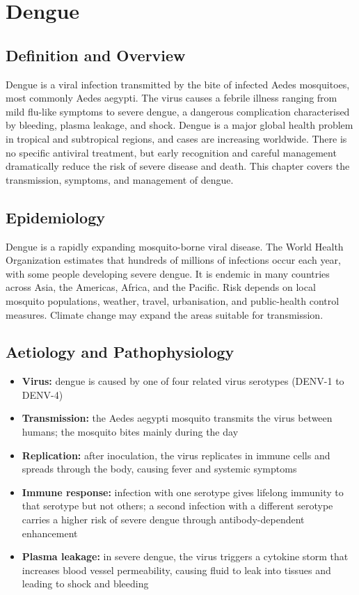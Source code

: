 \chapter{Dengue}

\section*{Definition and Overview}
Dengue is a viral infection transmitted by the bite of infected Aedes mosquitoes, most commonly Aedes aegypti. The virus causes a febrile illness ranging from mild flu-like symptoms to severe dengue, a dangerous complication characterised by bleeding, plasma leakage, and shock. Dengue is a major global health problem in tropical and subtropical regions, and cases are increasing worldwide. There is no specific antiviral treatment, but early recognition and careful management dramatically reduce the risk of severe disease and death. This chapter covers the transmission, symptoms, and management of dengue.

\section*{Epidemiology}
Dengue is a rapidly expanding mosquito-borne viral disease. The World Health Organization estimates that hundreds of millions of infections occur each year, with some people developing severe dengue. It is endemic in many countries across Asia, the Americas, Africa, and the Pacific. Risk depends on local mosquito populations, weather, travel, urbanisation, and public-health control measures. Climate change may expand the areas suitable for transmission.

\section*{Aetiology and Pathophysiology}
\begin{itemize}
    \item \textbf{Virus:} dengue is caused by one of four related virus serotypes (DENV-1 to DENV-4)
    \item \textbf{Transmission:} the Aedes aegypti mosquito transmits the virus between humans; the mosquito bites mainly during the day
    \item \textbf{Replication:} after inoculation, the virus replicates in immune cells and spreads through the body, causing fever and systemic symptoms
    \item \textbf{Immune response:} infection with one serotype gives lifelong immunity to that serotype but not others; a second infection with a different serotype carries a higher risk of severe dengue through antibody-dependent enhancement
    \item \textbf{Plasma leakage:} in severe dengue, the virus triggers a cytokine storm that increases blood vessel permeability, causing fluid to leak into tissues and leading to shock and bleeding
\end{itemize}

